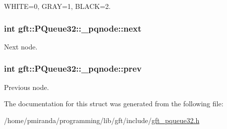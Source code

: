 W\+H\+I\+TE=0, G\+R\+AY=1, B\+L\+A\+CK=2. 

\subsubsection[{\texorpdfstring{next}{next}}]{\setlength{\rightskip}{0pt plus 5cm}int gft\+::\+P\+Queue32\+::\+\_\+pqnode\+::next}\hypertarget{structgft_1_1PQueue32_1_1__pqnode_a044ff40f8cd925b0269ebada823fbc0c}{}\label{structgft_1_1PQueue32_1_1__pqnode_a044ff40f8cd925b0269ebada823fbc0c}


Next node. 

\subsubsection[{\texorpdfstring{prev}{prev}}]{\setlength{\rightskip}{0pt plus 5cm}int gft\+::\+P\+Queue32\+::\+\_\+pqnode\+::prev}\hypertarget{structgft_1_1PQueue32_1_1__pqnode_a2a10c5ab969878d64e00c1a272c55a42}{}\label{structgft_1_1PQueue32_1_1__pqnode_a2a10c5ab969878d64e00c1a272c55a42}


Previous node. 



The documentation for this struct was generated from the following file\+:\begin{DoxyCompactItemize}
\item 
/home/pmiranda/programming/lib/gft/include/\hyperlink{gft__pqueue32_8h}{gft\+\_\+pqueue32.\+h}\end{DoxyCompactItemize}
